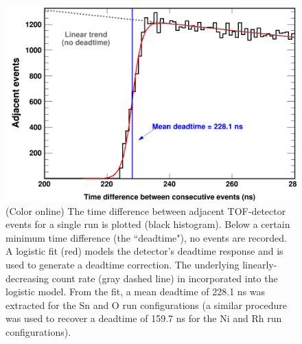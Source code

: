 \documentclass[twocolumn,secnumarabic,amssymb, nobibnotes, aps, prl,
superscriptaddress, nobalancelastpage]{revtex4}
\begin{document}
\begin{figure}
    \includegraphics[scale=0.24]{figures/TimeDifferenceBetweenEvents.png}
    \caption{(Color online) The time difference between adjacent TOF-detector
    events for a single run is plotted (black histogram). Below a certain
minimum time difference (the ``deadtime"), no events are recorded. A logistic
fit (red) models the detector's deadtime response and is used to generate a
deadtime correction. The underlying linearly-decreasing count rate (gray dashed
line) in incorporated into the logistic model. From the fit, a mean deadtime of
228.1 ns was extracted for the Sn and O run configurations (a similar
procedure was used to recover a deadtime of 159.7 ns for the Ni and Rh
run configurations).}
    \label{TimeDifferenceBetweenEvents}
\end{figure}
\end{document}
